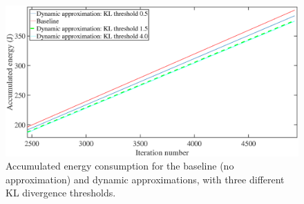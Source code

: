 \begin{figure}[tb]
  \centering
  \includegraphics[width=1\columnwidth]{img/Energy_cropped.eps}
  \caption{Accumulated energy consumption for the baseline (no approximation) and dynamic approximations, with three different KL divergence thresholds.}
  \label{fig:Energy_res_acc}
\end{figure}
